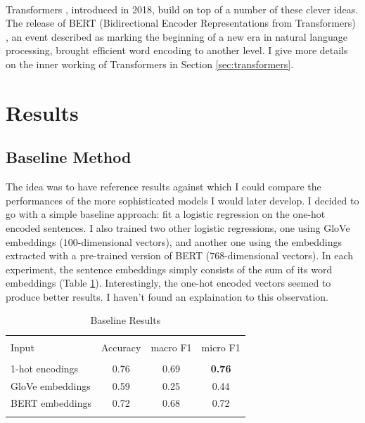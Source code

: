 \documentclass[final]{cvpr}
\begin{document}
\\
Transformers \cite{transformer}, introduced in 2018, build on top of a number of these clever ideas. The release of BERT (Bidirectional Encoder Representations from Transformers) \cite{BERT}, an event described as marking the beginning of a new era in natural language processing, brought efficient word encoding to another level. I give more details on the inner working of Transformers in Section \ref{sec:transformers}.

\section{Results}

\subsection{Baseline Method}

The idea was to have reference results against which I could compare the performances of the more sophisticated models I would later develop. I decided to go with a simple baseline approach: fit a logistic regression on the one-hot encoded sentences. I also trained two other logistic regressions, one using GloVe embeddings ($100$-dimensional vectors), and another one using the embeddings extracted with a pre-trained version of BERT ($768$-dimensional vectors). In each experiment, the sentence embeddings simply consists of the sum of its word embeddings (Table \ref{tab:logistic_regression}). Interestingly, the one-hot encoded vectors seemed to produce better results. I haven't found an explaination to this observation.

\begin{table}[h!]
	\begin{center}
		\begin{tabular}{ l c c c  } 
			\hline
			\\ [-1.7mm] 
			Input & Accuracy & macro F1 & micro F1 \\ [0.7mm] 
			\hline
			\\ [-1.5mm] 
			1-hot encodings & 0.76 & 0.69 & \textbf{0.76} \\
			GloVe embeddings & 0.59 & 0.25 & 0.44 \\
			BERT embeddings & 0.72 & 0.68 & 0.72 \\[0.5mm] 
			\hline
			\\ [-0.9mm] 
		\end{tabular}
		\caption{Baseline Results}
		\label{tab:logistic_regression}
	\end{center}
\end{table}
\end{document}
